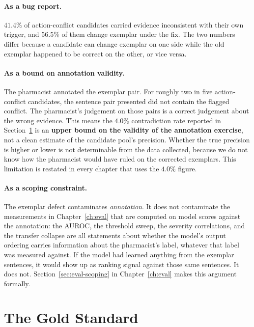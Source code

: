 \paragraph{As a bug report.} $41.4\%$ of action-conflict candidates carried
evidence inconsistent with their own trigger, and $56.5\%$ of them change
exemplar under the fix. The two numbers differ because a candidate can change
exemplar on one side while the old exemplar happened to be correct on the other,
or vice versa.

\paragraph{As a bound on annotation validity.} The pharmacist annotated the
exemplar pair. For roughly two in five action-conflict candidates, the sentence
pair presented did not contain the flagged conflict. The pharmacist's judgement
on those pairs is a correct judgement about the wrong evidence. This means the
$4.0\%$ contradiction rate reported in Section~\ref{sec:gold} is an
\textbf{upper bound on the validity of the annotation exercise}, not a clean
estimate of the candidate pool's precision. Whether the true precision is higher
or lower is not determinable from the data collected, because we do not know how
the pharmacist would have ruled on the corrected exemplars. This limitation is
restated in every chapter that uses the $4.0\%$ figure.

\paragraph{As a scoping constraint.} The exemplar defect contaminates
\emph{annotation}. It does not contaminate the measurements in
Chapter~\ref{ch:eval} that are computed on model scores against the annotation:
the AUROC, the threshold sweep, the severity correlations, and the transfer
collapse are all statements about whether the model's output ordering carries
information about the pharmacist's label, whatever that label was measured
against. If the model had learned anything from the exemplar sentences, it would
show up as ranking signal against those same sentences. It does not.
Section~\ref{sec:eval-scoping} in Chapter~\ref{ch:eval} makes this argument
formally.

\section{The Gold Standard}
\label{sec:gold}

